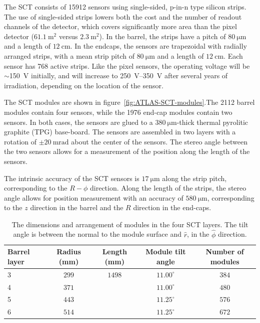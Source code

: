 The SCT consists of 15912 sensors using single-sided, p-in-n type silicon strips. The use of single-sided strips lowers both the cost and the number of readout channels of the detector, which covers significantly more area than the pixel detector ($\SI{61.1}{\meter\tothe{2}}$ versus $\SI{2.3}{\meter\tothe{2}}$). In the barrel, the strips have a pitch of $\SI{80}{\micro\meter}$ and a length of $\SI{12}{\centi\meter}$. In the endcaps, the sensors are trapezoidal with radially arranged strips, with a mean strip pitch of $\SI{80}{\micro\meter}$ and a length of $\SI{12}{\centi\meter}$. Each sensor has 768 active strips. Like the pixel sensors, the operating voltage will be $\sim$\SI{150}{\volt} initially, and will increase to \SIrange[range-phrase=-]{250}{350}{\volt} after several years of irradiation, depending on the location of the sensor. 

The SCT modules are shown in figure~\ref{fig:ATLAS-SCT-modules}.The 2112 barrel modules contain four sensors, while the 1976 end-cap modules contain two sensors. In both cases, the sensors are glued to a $\SI{380}{\micro\meter}$-thick thermal pyrolitic graphite (TPG) base-board. The sensors are assembled in two layers with a rotation of $\pm\SI{20}{\milli\radian}$ about the center of the sensors. The stereo angle between the two sensors allows for a measurement of the position along the length of the sensors. 


The intrinsic accuracy of the SCT sensors is $\SI{17}{\micro\meter}$ along the strip pitch, corresponding to the $R-\phi$ direction. Along the length of the strips, the stereo angle allows for position measurement with an accuracy of $\SI{580}{\micro\meter}$, corresponding to the $z$ direction in the barrel and the $R$ direction in the end-caps.

\begin{table}[htbp]
	\centering
	\scriptsize
	\begin{tabular}{|l|c|c|c|c|}
		\hline
		\textbf{Barrel layer} & \textbf{Radius (mm)} & \textbf{Length (mm)} & \textbf{Module tilt angle} & \textbf{Number of modules} \\
		\hline
		3 & $299$ & $1498$ & $11.00^{\circ}$ & $384$ \\
		4 & $371$ & & $11.00^{\circ}$ & $480$ \\
		5 & $443$ & & $11.25^{\circ}$ & $576$ \\
		6 & $514$ & & $11.25^{\circ}$ & $672$ \\
		\hline
	\end{tabular}
	\caption{The dimensions and arrangement of modules in the four SCT layers. The tilt angle is between the normal to the module surface and $\hat{r}$, in the $\hat{\phi}$ direction.}
	\label{fig:ATLAS-SCT-layout}
\end{table}

